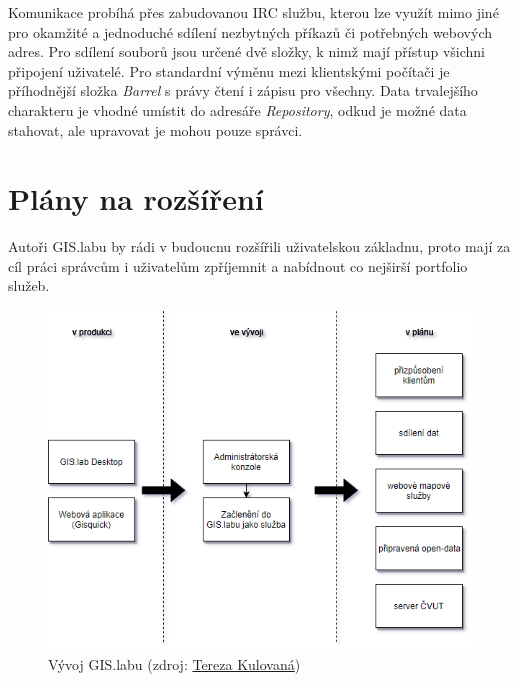 Komunikace probíhá přes zabudovanou IRC službu, kterou lze využít mimo
jiné pro okamžité a jednoduché sdílení nezbytných příkazů či
potřebných webových adres. Pro sdílení souborů jsou určené dvě složky,
k nimž mají přístup všichni připojení uživatelé. Pro standardní výměnu
mezi klientskými počítači je příhodnější složka \textit{Barrel} s
právy čtení i zápisu pro všechny. Data trvalejšího charakteru je
vhodné umístit do adresáře \textit{Repository}, odkud je možné data
stahovat, ale upravovat je mohou pouze správci.

\section{Plány na rozšíření}
\label{vision}

Autoři GIS.labu by rádi v budoucnu rozšířili uživatelskou základnu,
proto mají za cíl práci správcům i uživatelům zpříjemnit a nabídnout
co nejširší portfolio služeb.

\begin{figure}[H] \centering
    \includegraphics[width=350pt]{./pictures/gislab_road_map.png}
    \caption[Vývoj GIS.labu]{Vývoj GIS.labu (zdroj:
	\href{}{Tereza Kulovaná})}
    \label{fig:gislab-roadmap}
\end{figure}


